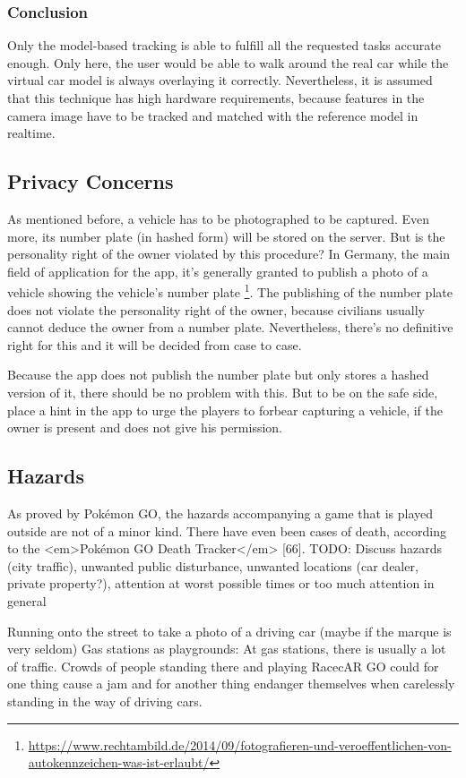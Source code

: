 \subsubsection{Conclusion}
Only the model-based tracking is able to fulfill all the requested tasks accurate enough. Only here, the user would be able to walk around the real car while the virtual car model is always overlaying it correctly. Nevertheless, it is assumed that this technique has high hardware requirements, because features in the camera image have to be tracked and matched with the reference model in realtime.

\subsection{Privacy Concerns}
As mentioned before, a vehicle has to be photographed to be captured. Even more, its number plate (in hashed form) will be stored on the server. But is the personality right of the owner violated by this procedure? In Germany, the main field of application for the app, it's generally granted to publish a photo of a vehicle showing the vehicle's number plate \footnote{\url{https://www.rechtambild.de/2014/09/fotografieren-und-veroeffentlichen-von-autokennzeichen-was-ist-erlaubt/}}. The publishing of the number plate does not violate the personality right of the owner, because civilians usually cannot deduce the owner from a number plate. Nevertheless, there's no definitive right for this and it will be decided from case to case.

Because the app does not publish the number plate but only stores a hashed version of it, there should be no problem with this. But to be on the safe side, place a hint in the app to urge the players to forbear capturing a vehicle, if the owner is present and does not give his permission.

\subsection{Hazards}\label{sec:hazards}
As proved by Pokémon GO, the hazards accompanying a game that is played outside are not of a minor kind. There have even been cases of death, according to the <em>Pokémon GO Death Tracker</em> [66].
TODO:
Discuss hazards (city traffic), unwanted public disturbance, unwanted locations (car dealer, private property?), attention at worst possible times or too much attention in general

Running onto the street to take a photo of a driving car (maybe if the marque is very seldom)
Gas stations as playgrounds: At gas stations, there is usually a lot of traffic. Crowds of people standing there and playing RacecAR GO could for one thing cause a jam and for another thing endanger themselves when carelessly standing in the way of driving cars.

